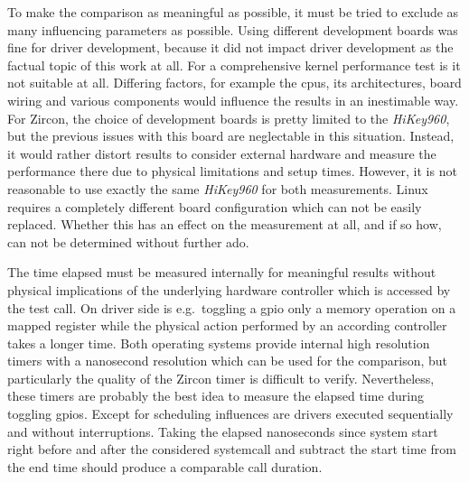 To make the comparison as meaningful as possible, it must be tried to exclude as many influencing parameters as possible.
Using different development boards was fine for driver development, because it did not impact driver development as the factual topic of this work at all.
For a comprehensive kernel performance test is it not suitable at all.
Differing factors, for example the \acp{cpu}, its architectures, board wiring and various components would influence the results in an inestimable way.
For Zircon, the choice of development boards is pretty limited to the \textit{HiKey960}, but the previous issues with this board are neglectable in this situation.
Instead, it would rather distort results to consider external hardware and measure the performance there due to physical limitations and setup times.
However, it is not reasonable to use exactly the same \textit{HiKey960} for both measurements.
Linux requires a completely different board configuration which can not be easily replaced.
Whether this has an effect on the measurement at all, and if so how, can not be determined without further ado.

The time elapsed must be measured internally for meaningful results without physical implications of the underlying hardware controller which is accessed by the test call.
On driver side is e.g.\ toggling a \ac{gpio} only a memory operation on a mapped register while the physical action performed by an according controller takes a longer time.
Both operating systems provide internal high resolution timers with a nanosecond resolution which can be used for the comparison, but particularly the quality of the Zircon timer is difficult to verify.
Nevertheless, these timers are probably the best idea to measure the elapsed time during toggling \acp{gpio}.
Except for scheduling influences are drivers executed sequentially and without interruptions.
Taking the elapsed nanoseconds since system start right before and after the considered systemcall and subtract the start time from the end time should produce a comparable call duration.

